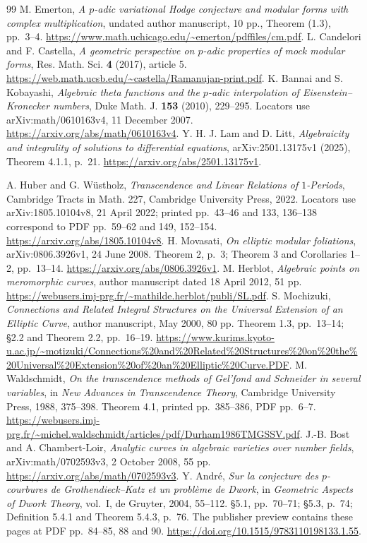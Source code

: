 \documentclass[11pt]{article}
\theoremstyle{definition}\newtheorem{definition}[theorem]{Definition}
\theoremstyle{remark}\newtheorem{remark}[theorem]{Remark}
\begin{document}
\begin{thebibliography}{99}
 M. Emerton, \emph{A $p$-adic variational Hodge conjecture and modular forms with complex multiplication}, undated author manuscript, 10 pp., Theorem (1.3), pp.~3--4. \url{https://www.math.uchicago.edu/~emerton/pdffiles/cm.pdf}.
 L. Candelori and F. Castella, \emph{A geometric perspective on $p$-adic properties of mock modular forms}, Res. Math. Sci. \textbf{4} (2017), article 5. \url{https://web.math.ucsb.edu/~castella/Ramanujan-print.pdf}.
 K. Bannai and S. Kobayashi, \emph{Algebraic theta functions and the $p$-adic interpolation of Eisenstein--Kronecker numbers}, Duke Math. J. \textbf{153} (2010), 229--295. Locators use arXiv:math/0610163v4, 11 December 2007. \url{https://arxiv.org/abs/math/0610163v4}.
 Y. H. J. Lam and D. Litt, \emph{Algebraicity and integrality of solutions to differential equations}, arXiv:2501.13175v1 (2025), Theorem 4.1.1, p.~21. \url{https://arxiv.org/abs/2501.13175v1}.

 A. Huber and G. W\"ustholz, \emph{Transcendence and Linear Relations of $1$-Periods}, Cambridge Tracts in Math. 227, Cambridge University Press, 2022. Locators use arXiv:1805.10104v8, 21 April 2022; printed pp.~43--46 and 133, 136--138 correspond to PDF pp.~59--62 and 149, 152--154. \url{https://arxiv.org/abs/1805.10104v8}.
 H. Movasati, \emph{On elliptic modular foliations}, arXiv:0806.3926v1, 24 June 2008. Theorem 2, p.~3; Theorem 3 and Corollaries 1--2, pp.~13--14. \url{https://arxiv.org/abs/0806.3926v1}.
 M. Herblot, \emph{Algebraic points on meromorphic curves}, author manuscript dated 18 April 2012, 51 pp. \url{https://webusers.imj-prg.fr/~mathilde.herblot/publi/SL.pdf}.
 S. Mochizuki, \emph{Connections and Related Integral Structures on the Universal Extension of an Elliptic Curve}, author manuscript, May 2000, 80 pp. Theorem 1.3, pp.~13--14; \S2.2 and Theorem 2.2, pp.~16--19. \url{https://www.kurims.kyoto-u.ac.jp/~motizuki/Connections%20and%20Related%20Structures%20on%20the%20Universal%20Extension%20of%20an%20Elliptic%20Curve.PDF}.
 M. Waldschmidt, \emph{On the transcendence methods of Gel'fond and Schneider in several variables}, in \emph{New Advances in Transcendence Theory}, Cambridge University Press, 1988, 375--398. Theorem 4.1, printed pp.~385--386, PDF pp.~6--7. \url{https://webusers.imj-prg.fr/~michel.waldschmidt/articles/pdf/Durham1986TMGSSV.pdf}.
 J.-B. Bost and A. Chambert-Loir, \emph{Analytic curves in algebraic varieties over number fields}, arXiv:math/0702593v3, 2 October 2008, 55 pp. \url{https://arxiv.org/abs/math/0702593v3}.
 Y. Andr\'e, \emph{Sur la conjecture des $p$-courbures de Grothendieck--Katz et un probl\`eme de Dwork}, in \emph{Geometric Aspects of Dwork Theory}, vol.~I, de Gruyter, 2004, 55--112. \S5.1, pp.~70--71; \S5.3, p.~74; Definition 5.4.1 and Theorem 5.4.3, p.~76. The publisher preview contains these pages at PDF pp.~84--85, 88 and 90. \url{https://doi.org/10.1515/9783110198133.1.55}.


\end{thebibliography}
\end{document}
